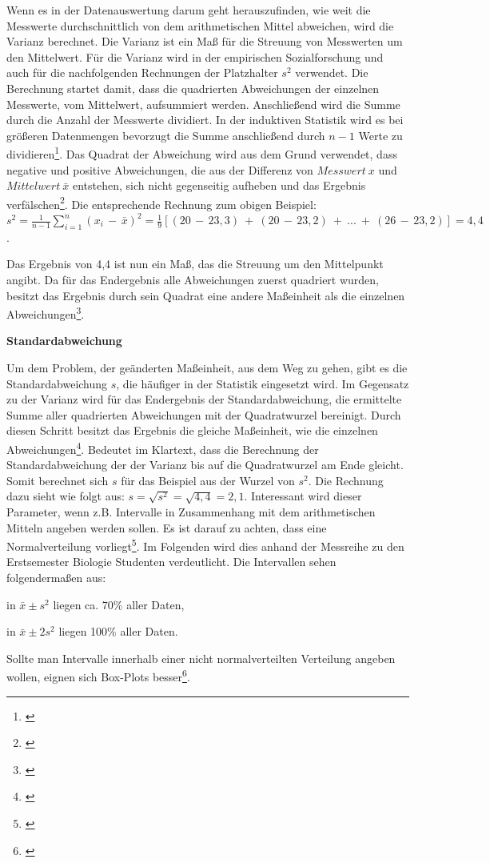 Wenn es in der Datenauswertung darum geht herauszufinden, wie weit die Messwerte durchschnittlich von dem arithmetischen Mittel abweichen, wird die Varianz berechnet. Die Varianz ist ein Maß für die Streuung von Messwerten um den Mittelwert. Für die Varianz wird in der empirischen Sozialforschung und auch für die nachfolgenden Rechnungen der Platzhalter $s^2$ verwendet. Die Berechnung startet damit, dass die quadrierten Abweichungen der einzelnen Messwerte, vom Mittelwert, aufsummiert werden. Anschließend wird die Summe durch die Anzahl der Messwerte dividiert. In der induktiven Statistik wird es bei größeren Datenmengen bevorzugt die Summe anschließend durch $n-1$ Werte zu dividieren\footnote{\cite[vgl.][65]{Statistik2016}}. Das Quadrat der Abweichung wird aus dem Grund verwendet, dass negative und positive Abweichungen, die aus der Differenz von $Messwert\:x$ und $Mittelwert\:\bar{x} $ entstehen, sich nicht gegenseitig aufheben und das Ergebnis verfälschen\footnote{\cite[vgl.][65]{Statistik2016}}. Die entsprechende Rechnung zum obigen Beispiel: \\
$s^2 = \frac{1}{n - 1} \sum \limits_{i=1}^n (x_i\,-\,\bar{x})^2 = \frac{1}{9}[ (20\,-\,23,3)\:+\:(20\,-\,23,2)\:+\:...\:+\:(26\,-\,23,2)]= 4,4$. 

Das Ergebnis von 4,4 ist nun ein Maß, das die Streuung um den Mittelpunkt angibt. Da für das Endergebnis alle Abweichungen zuerst quadriert wurden, besitzt das Ergebnis durch sein Quadrat eine andere Maßeinheit als die einzelnen Abweichungen\footnote{\cite[vgl.][65]{Statistik2016}}.

\textbf{Standardabweichung}

Um dem Problem, der geänderten Maßeinheit, aus dem Weg zu gehen, gibt es die Standardabweichung $s$, die häufiger in der Statistik eingesetzt wird. Im Gegensatz zu der Varianz wird für das Endergebnis der Standardabweichung, die ermittelte Summe aller quadrierten Abweichungen mit der Quadratwurzel bereinigt. Durch diesen Schritt besitzt das Ergebnis die gleiche Maßeinheit, wie die einzelnen Abweichungen\footnote{\cite[vgl.][65]{Statistik2016}}. Bedeutet im Klartext, dass die Berechnung der Standardabweichung der der Varianz bis auf die Quadratwurzel am Ende gleicht. Somit berechnet sich $s$ für das Beispiel aus der Wurzel von $s^2$. Die Rechnung dazu sieht wie folgt aus: $s = \sqrt{s^2} = \sqrt{4,4} = 2,1$. Interessant wird dieser Parameter, wenn z.B. Intervalle in Zusammenhang mit dem arithmetischen Mitteln angeben werden sollen. Es ist darauf zu achten, dass eine Normalverteilung vorliegt\footnote{\cite[vgl.][67]{Statistik2016}}. Im Folgenden wird dies anhand der Messreihe zu den Erstsemester Biologie Studenten verdeutlicht. Die Intervallen sehen folgendermaßen aus:
\begin{compactitem}
    \item in $\bar{x} \pm s^2$ liegen ca. 70\% aller Daten,
    \item in $\bar{x} \pm 2s^2$ liegen 100\% aller Daten. 
\end{compactitem}
Sollte man Intervalle innerhalb einer nicht normalverteilten Verteilung angeben wollen, eignen sich Box-Plots besser\footnote{\cite[vgl.][67]{Statistik2016}}.


